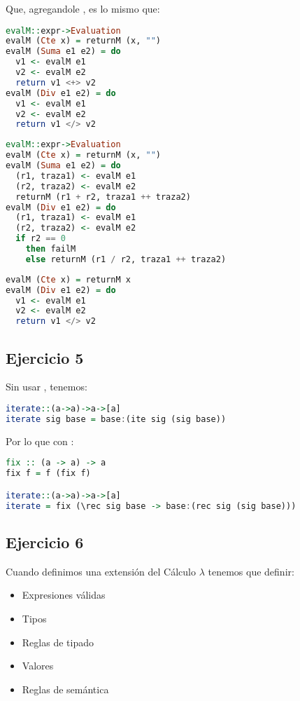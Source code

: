 Que, agregandole , es lo mismo que:

\begin{lstlisting}[language=Haskell]
evalM::expr->Evaluation
evalM (Cte x) = returnM (x, "")
evalM (Suma e1 e2) = do
  v1 <- evalM e1
  v2 <- evalM e2
  return v1 <+> v2
evalM (Div e1 e2) = do
  v1 <- evalM e1
  v2 <- evalM e2
  return v1 </> v2
\end{lstlisting}

\begin{lstlisting}[language=Haskell]
evalM::expr->Evaluation
evalM (Cte x) = returnM (x, "")
evalM (Suma e1 e2) = do
  (r1, traza1) <- evalM e1
  (r2, traza2) <- evalM e2
  returnM (r1 + r2, traza1 ++ traza2)
evalM (Div e1 e2) = do
  (r1, traza1) <- evalM e1
  (r2, traza2) <- evalM e2
  if r2 == 0
    then failM
    else returnM (r1 / r2, traza1 ++ traza2)
\end{lstlisting}

\begin{lstlisting}[language=Haskell]
evalM (Cte x) = returnM x
evalM (Div e1 e2) = do
  v1 <- evalM e1
  v2 <- evalM e2
  return v1 </> v2
\end{lstlisting}

\subsection*{Ejercicio 5} Sin usar , tenemos:
\begin{lstlisting}[language=Haskell]
iterate::(a->a)->a->[a]
iterate sig base = base:(ite sig (sig base))
\end{lstlisting}

Por lo que con :
\begin{lstlisting}[language=Haskell]
fix :: (a -> a) -> a
fix f = f (fix f)

iterate::(a->a)->a->[a]
iterate = fix (\rec sig base -> base:(rec sig (sig base)))
\end{lstlisting}

\subsection*{Ejercicio 6} Cuando definimos una extensión del Cálculo $\lambda$ tenemos que definir:
\begin{itemize}
  \item Expresiones válidas
  \item Tipos
  \item Reglas de tipado
  \item Valores
  \item Reglas de semántica
\end{itemize}

